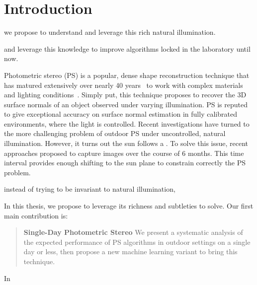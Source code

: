 \chapter*{Introduction}         %



we propose to understand and leverage this rich natural illumination.

and leverage this knowledge to improve algorithms locked in the laboratory until now.

Photometric stereo (PS) is a popular, dense shape reconstruction technique that has matured extensively over nearly 40 years~\cite{woodham-opteng-80} to work with complex materials and lighting conditions~\cite{alldrin-cvpr-08,basri-ijcv-07,johnson-cvpr-11,oxholm-eccv-12}.
Simply put, this technique proposes to recover the 3D surface normals of an object observed under varying illumination.
PS is reputed to give exceptional accuracy on surface normal estimation in fully calibrated environments, where the light is controlled.
Recent investigations have turned to the more challenging problem of outdoor PS under uncontrolled, natural illumination. However, it turns out the sun follows a . To solve this issue, recent approaches proposed to capture images over the course of 6 months\cite{ackermann-cvpr-12,abrams-eccv-12}. This time interval provides enough shifting to the sun plane to constrain correctly the PS problem.

instead of trying to be invariant to natural illumination, 

In this thesis, we propose to leverage its richness and subtleties to solve. Our first main contribution is:

\blockquote{\textbf{Single-Day Photometric Stereo} We present a systematic analysis of the expected performance of PS algorithms in outdoor settings on a single day or less, then propose a new machine learning variant to bring this technique.}




In